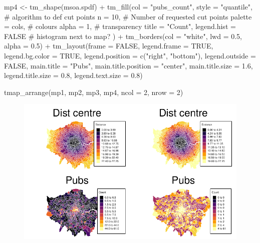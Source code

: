 \documentclass[
  letterpaper,
  DIV=11,
  numbers=noendperiod]{scrreprt}
\newenvironment{Shaded}{\begin{snugshade}}{\end{snugshade}}
\newcommand{\AttributeTok}[1]{\textcolor[rgb]{0.40,0.45,0.13}{#1}}
\newcommand{\CommentTok}[1]{\textcolor[rgb]{0.37,0.37,0.37}{#1}}
\newcommand{\ConstantTok}[1]{\textcolor[rgb]{0.56,0.35,0.01}{#1}}
\newcommand{\DecValTok}[1]{\textcolor[rgb]{0.68,0.00,0.00}{#1}}
\newcommand{\FloatTok}[1]{\textcolor[rgb]{0.68,0.00,0.00}{#1}}
\newcommand{\FunctionTok}[1]{\textcolor[rgb]{0.28,0.35,0.67}{#1}}
\newcommand{\NormalTok}[1]{\textcolor[rgb]{0.00,0.23,0.31}{#1}}
\newcommand{\OtherTok}[1]{\textcolor[rgb]{0.00,0.23,0.31}{#1}}
\newcommand{\SpecialCharTok}[1]{\textcolor[rgb]{0.37,0.37,0.37}{#1}}
\newcommand{\StringTok}[1]{\textcolor[rgb]{0.13,0.47,0.30}{#1}}
\begin{document}
\begin{Shaded}
\begin{Highlighting}[]
\NormalTok{mp4 }\OtherTok{\textless{}{-}}  \FunctionTok{tm\_shape}\NormalTok{(msoa.spdf) }\SpecialCharTok{+} 
  \FunctionTok{tm\_fill}\NormalTok{(}\AttributeTok{col =} \StringTok{"pubs\_count"}\NormalTok{, }
          \AttributeTok{style =} \StringTok{"quantile"}\NormalTok{, }\CommentTok{\# algorithm to def cut points}
          \AttributeTok{n =} \DecValTok{10}\NormalTok{, }\CommentTok{\# Number of requested cut points}
          \AttributeTok{palette =}\NormalTok{ cols, }\CommentTok{\# colours}
          \AttributeTok{alpha =} \DecValTok{1}\NormalTok{, }\CommentTok{\# transparency }
          \AttributeTok{title =} \StringTok{"Count"}\NormalTok{, }
          \AttributeTok{legend.hist =} \ConstantTok{FALSE} \CommentTok{\# histogram next to map?}
\NormalTok{          ) }\SpecialCharTok{+}
  \FunctionTok{tm\_borders}\NormalTok{(}\AttributeTok{col =} \StringTok{"white"}\NormalTok{, }\AttributeTok{lwd =} \FloatTok{0.5}\NormalTok{, }\AttributeTok{alpha =} \FloatTok{0.5}\NormalTok{) }\SpecialCharTok{+}
  \FunctionTok{tm\_layout}\NormalTok{(}\AttributeTok{frame =} \ConstantTok{FALSE}\NormalTok{,}
            \AttributeTok{legend.frame =} \ConstantTok{TRUE}\NormalTok{, }\AttributeTok{legend.bg.color =} \ConstantTok{TRUE}\NormalTok{,}
            \AttributeTok{legend.position =} \FunctionTok{c}\NormalTok{(}\StringTok{"right"}\NormalTok{, }\StringTok{"bottom"}\NormalTok{),}
            \AttributeTok{legend.outside =} \ConstantTok{FALSE}\NormalTok{,}
            \AttributeTok{main.title =} \StringTok{"Pubs"}\NormalTok{, }
            \AttributeTok{main.title.position =} \StringTok{"center"}\NormalTok{,}
            \AttributeTok{main.title.size =} \FloatTok{1.6}\NormalTok{,}
            \AttributeTok{legend.title.size =} \FloatTok{0.8}\NormalTok{,}
            \AttributeTok{legend.text.size =} \FloatTok{0.8}\NormalTok{)}


\FunctionTok{tmap\_arrange}\NormalTok{(mp1, mp2, mp3, mp4, }\AttributeTok{ncol =} \DecValTok{2}\NormalTok{, }\AttributeTok{nrow =} \DecValTok{2}\NormalTok{)}
\end{Highlighting}
\end{Shaded}

\begin{figure}[H]

{\centering \includegraphics{02_spatial-data_files/figure-pdf/unnamed-chunk-27-1.pdf}

}

\end{figure}
\end{document}
